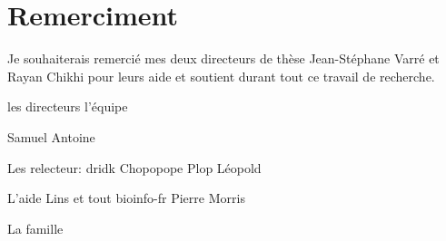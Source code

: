 \documentclass[main.tex]{subfiles}
\begin{document}
\section*{Remerciment}
%

Je souhaiterais remercié mes deux directeurs de thèse Jean-Stéphane Varré et Rayan Chikhi pour leurs aide et soutient  durant tout ce travail de recherche. 

les directeurs
l'équipe

Samuel
Antoine

Les relecteur:
dridk
Chopopope
Plop
Léopold

L'aide 
Lins et tout bioinfo-fr
Pierre Morris

La famille
\end{document}
